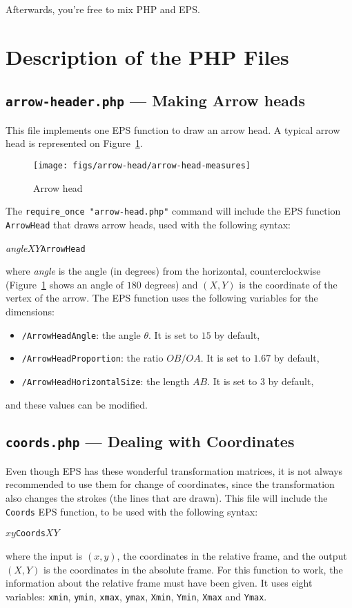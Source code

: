 \documentclass[a4paper]{scrartcl}
\newcommand\code[1]{\lstinline{#1}}
\begin{document}
Afterwards, you're free to mix PHP and EPS.

\section{Description of the PHP Files}
\subsection{\texttt{arrow-header.php} --- Making Arrow heads}
This file implements one EPS function to draw an arrow head.
A typical arrow head is represented on Figure~\ref{fig:arrow-head-explained}.
\begin{figure}[ht!]%
\centering
\texttt{[image: figs/arrow-head/arrow-head-measures]}%
\caption{Arrow head}%
\label{fig:arrow-head-explained}
\end{figure}

The \code{require_once "arrow-head.php"} command will include the EPS function
\texttt{ArrowHead} that draws arrow heads, used with the following syntax:
\begin{center}
\textit{angle}\quad$X$\quad$Y$\quad\texttt{ArrowHead}
\end{center}
where \textit{angle} is the angle (in degrees) from the horizontal,
counterclockwise (Figure~\ref{fig:arrow-head-explained} shows an angle of $180$
degrees) and $(X,Y)$ is the coordinate of the vertex of the arrow.
The EPS function uses the following variables for the dimensions:
\begin{itemize}
\item \texttt{/ArrowHeadAngle}: the angle $\theta$. It is set to $15$ by default,
\item \texttt{/ArrowHeadProportion}: the ratio $OB/OA$. It is set to $1.67$ by default,
\item \texttt{/ArrowHeadHorizontalSize}: the length $AB$. It is set to $3$ by default,
\end{itemize}
and these values can be modified.

\subsection{\texttt{coords.php} --- Dealing with Coordinates}
Even though EPS has these wonderful transformation matrices, it is not always
recommended to use them for change of coordinates, since the transformation
also changes the strokes (the lines that are drawn). This file will include
the \texttt{Coords} EPS function, to be used with the following syntax:
\begin{center}
$x$\quad$y$\quad\texttt{Coords}\quad$X$\quad$Y$
\end{center}
where the input is $(x,y)$, the coordinates in the relative frame, and the output $(X,Y)$
is the coordinates in the absolute frame. For this function to work, the information about
the relative frame must have been given. It uses eight variables:
\texttt{xmin}, \texttt{ymin}, \texttt{xmax}, \texttt{ymax},
\texttt{Xmin}, \texttt{Ymin}, \texttt{Xmax} and \texttt{Ymax}.
\end{document}
